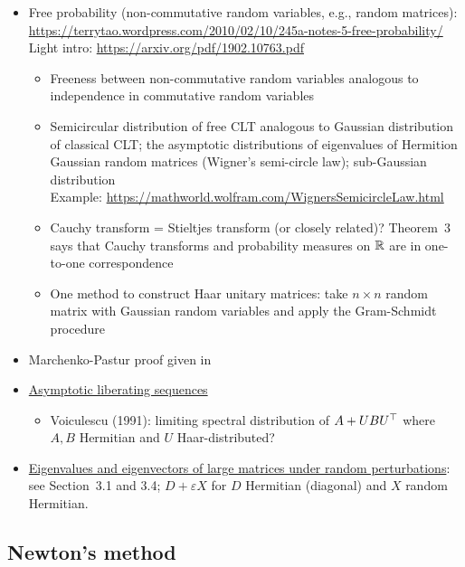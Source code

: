 \documentclass[10pt]{article}
\begin{document}
\begin{itemize}
\item
Free probability (non-commutative random variables, e.g., random matrices): \\
\url{https://terrytao.wordpress.com/2010/02/10/245a-notes-5-free-probability/} \\
Light intro: \url{https://arxiv.org/pdf/1902.10763.pdf} \citep{Xia:2019}
\begin{itemize}
\item
Freeness between non-commutative random variables analogous to independence in commutative random variables
\item
Semicircular distribution of free CLT analogous to Gaussian distribution of classical CLT; the asymptotic distributions of eigenvalues of Hermition Gaussian random matrices (Wigner's semi-circle law); sub-Gaussian distribution \\
Example: \url{https://mathworld.wolfram.com/WignersSemicircleLaw.html}
\item
Cauchy transform = Stieltjes transform (or closely related)? Theorem~3 says that Cauchy transforms and probability measures on $\mathbb{R}$ are in one-to-one correspondence
\item
One method to construct Haar unitary matrices: take $n\times n$ random matrix with \iid Gaussian random variables and apply the Gram-Schmidt procedure
\end{itemize}

\item
Marchenko-Pastur proof given in \citep{Couillet:2011}

\item
\href{https://arxiv.org/pdf/1302.5688.pdf}{Asymptotic liberating sequences}
\begin{itemize}
\item
Voiculescu (1991): limiting spectral distribution of $A+UBU^\top$ where $A,B$ Hermitian and $U$ Haar-distributed?
\end{itemize}

\item
\href{https://tel.archives-ouvertes.fr/tel-02468213/document}{Eigenvalues and eigenvectors of large matrices under random perturbations}: see Section~3.1 and 3.4; $D+\varepsilon X$ for $D$ Hermitian (diagonal) and $X$ random Hermitian.

\end{itemize}


\subsection{Newton's method}
\end{document}
